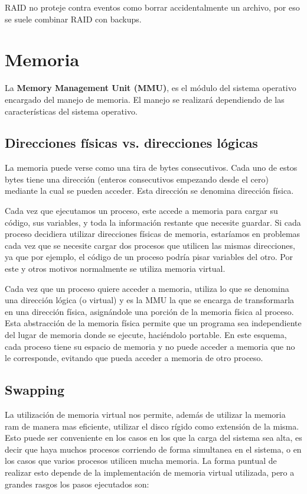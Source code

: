 \documentclass{article}
\begin{document}
RAID no proteje contra eventos como borrar accidentalmente un archivo, por eso se suele combinar RAID con backups.

\section{Memoria}

La \textbf{Memory Management Unit (MMU)}, es el módulo del sistema operativo encargado del manejo de memoria. El manejo se realizará dependiendo de las características del sistema operativo.

\subsection{Direcciones f\'isicas vs. direcciones l\'ogicas}

La memoria puede verse como una tira de bytes consecutivos. Cada uno de estos bytes tiene una direcci\'on (enteros consecutivos empezando desde el cero) mediante la cual se pueden acceder. Esta direcci\'on se denomina direcci\'on f\'isica.

Cada vez que ejecutamos un proceso, este accede a memoria para cargar su c\'odigo, sus variables, y toda la informaci\'on restante que necesite guardar. Si cada proceso decidiera utilizar direcciones físicas de memoria, estar\'iamos en problemas cada vez que se necesite cargar dos procesos que utilicen las mismas direcciones, ya que por ejemplo, el c\'odigo de un proceso podr\'ia pisar variables del otro. Por este y otros motivos normalmente se utiliza memoria virtual.

Cada vez que un proceso quiere acceder a memoria, utiliza lo que se denomina una direcci\'on l\'ogica (o virtual) y es la MMU la que se encarga de transformarla en una direcci\'on f\'isica, asign\'andole una porci\'on de la memoria f\'isica al proceso. Esta abstracción de la memoria física permite que un programa sea independiente del lugar de memoria donde se ejecute, haciéndolo portable. En este esquema, cada proceso tiene su espacio de memoria y no puede acceder a memoria que no le corresponde, evitando que pueda acceder a memoria de otro proceso.

\subsection{Swapping}

La utilización de memoria virtual nos permite, además de utilizar la memoria ram de manera mas eficiente, utilizar el disco rígido como extensión de la misma. Esto puede ser conveniente en los casos en los que la carga del sistema sea alta, es decir que haya muchos procesos corriendo de forma simultanea en el sistema, o en los casos que varios procesos utilicen mucha memoria. La forma puntual de realizar esto depende de la implementación de memoria virtual utilizada, pero a grandes rasgos los pasos ejecutados son:
\end{document}
